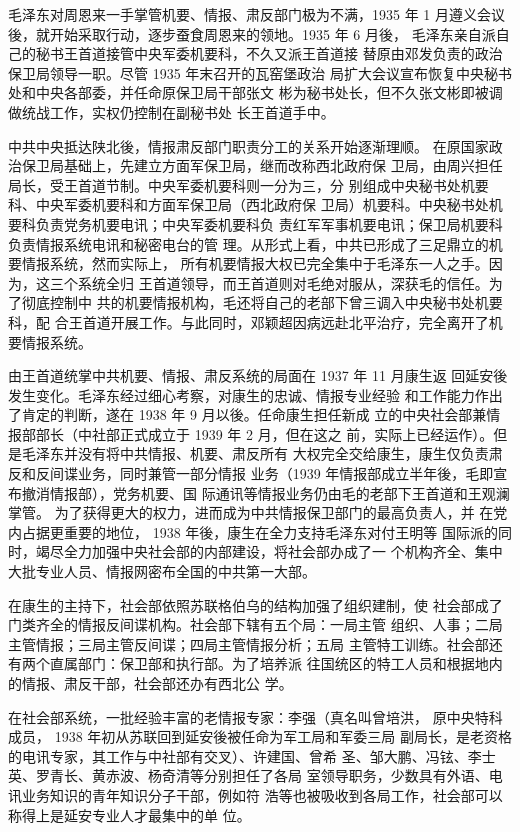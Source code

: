 毛泽东对周恩来一手掌管机要、情报、肃反部门极为不满，1935 年 1
月遵义会议後，就开始采取行动，逐步蚕食周恩来的领地。1935 年 6 月後，
毛泽东亲自派自己的秘书王首道接管中央军委机要科，不久又派王首道接
替原由邓发负责的政治保卫局领导一职。尽管 1935 年末召开的瓦窑堡政治
局扩大会议宣布恢复中央秘书处和中央各部委，并任命原保卫局干部张文
彬为秘书处长，但不久张文彬即被调做统战工作，实权仍控制在副秘书处
长王首道手中。

中共中央抵达陕北後，情报肃反部门职责分工的关系开始逐渐理顺。
在原国家政治保卫局基础上，先建立方面军保卫局，继而改称西北政府保
卫局，由周兴担任局长，受王首道节制。中央军委机要科则一分为三，分
别组成中央秘书处机要科、中央军委机要科和方面军保卫局（西北政府保
卫局）机要科。中央秘书处机要科负责党务机要电讯；中央军委机要科负
责红军军事机要电讯；保卫局机要科负责情报系统电讯和秘密电台的管
理。从形式上看，中共已形成了三足鼎立的机要情报系统，然而实际上，
所有机要情报大权已完全集中于毛泽东一人之手。因为，这三个系统全归
王首道领导，而王首道则对毛绝对服从，深获毛的信任。为了彻底控制中
共的机要情报机构，毛还将自己的老部下曾三调入中央秘书处机要科，配
合王首道开展工作。与此同时，邓颖超因病远赴北平治疗，完全离开了机
要情报系统。

由王首道统掌中共机要、情报、肃反系统的局面在 1937 年 11 月康生返
回延安後发生变化。毛泽东经过细心考察，对康生的忠诚、情报专业经验
和工作能力作出了肯定的判断，遂在 1938 年 9 月以後。任命康生担任新成
立的中央社会部兼情报部部长（中社部正式成立于 1939 年 2 月，但在这之
前，实际上已经运作）。但是毛泽东并没有将中共情报、机要、肃反所有
大权完全交给康生，康生仅负责肃反和反间谍业务，同时兼管一部分情报
业务（1939 年情报部成立半年後，毛即宣布撤消情报部），党务机要、国
际通讯等情报业务仍由毛的老部下王首道和王观澜掌管。
为了获得更大的权力，进而成为中共情报保卫部门的最高负责人，并
在党内占据更重要的地位， 1938 年後，康生在全力支持毛泽东对付王明等
国际派的同时，竭尽全力加强中央社会部的内部建设，将社会部办成了一
个机构齐全、集中大批专业人员、情报网密布全国的中共第一大部。

在康生的主持下，社会部依照苏联格伯乌的结构加强了组织建制，使
社会部成了门类齐全的情报反间谍机构。社会部下辖有五个局：一局主管
组织、人事；二局主管情报；三局主管反间谍；四局主管情报分析；五局
主管特工训练。社会部还有两个直属部门：保卫部和执行部。为了培养派
往国统区的特工人员和根据地内的情报、肃反干部，社会部还办有西北公
学。

在社会部系统，一批经验丰富的老情报专家：李强（真名叫曾培洪，
原中央特科成员， 1938 年初从苏联回到延安後被任命为军工局和军委三局
副局长，是老资格的电讯专家，其工作与中社部有交叉）、许建国、曾希
圣、邹大鹏、冯铉、李士英、罗青长、黄赤波、杨奇清等分别担任了各局
室领导职务，少数具有外语、电讯业务知识的青年知识分子干部，例如符
浩等也被吸收到各局工作，社会部可以称得上是延安专业人才最集中的单
位。

